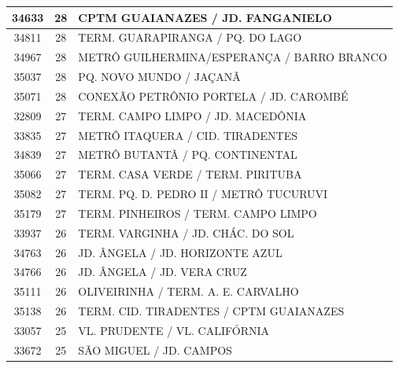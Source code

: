 \documentclass[
	12pt,				%
	oneside,			%
	a4paper,			%
	english,			%
	brazil				%
	]{abntex2ppgsi}
\begin{document}
{{\begin{apendicesenv}
\begin{longtable}{c|c|p{7cm}}
    34633 & 28    & CPTM GUAIANAZES / JD. FANGANIELO \\
\hline

    34811 & 28    & TERM. GUARAPIRANGA / PQ. DO LAGO \\
\hline

    34967 & 28    & METRÔ GUILHERMINA/ESPERANÇA / BARRO BRANCO \\
\hline

    35037 & 28    & PQ. NOVO MUNDO / JAÇANÃ \\
\hline

    35071 & 28    & CONEXÃO PETRÔNIO PORTELA / JD. CAROMBÉ \\
\hline

    32809 & 27    & TERM. CAMPO LIMPO / JD. MACEDÔNIA \\
\hline

    33835 & 27    & METRÔ ITAQUERA / CID. TIRADENTES \\
\hline

    34839 & 27    & METRÔ BUTANTÃ / PQ. CONTINENTAL \\
\hline

    35066 & 27    & TERM. CASA VERDE / TERM. PIRITUBA \\
\hline

    35082 & 27    & TERM. PQ. D. PEDRO II / METRÔ TUCURUVI \\
\hline

    35179 & 27    & TERM. PINHEIROS / TERM. CAMPO LIMPO \\
\hline

    33937 & 26    & TERM. VARGINHA / JD. CHÁC. DO SOL \\
\hline

    34763 & 26    & JD. ÂNGELA / JD. HORIZONTE AZUL \\
\hline

    34766 & 26    & JD. ÂNGELA / JD. VERA CRUZ \\
\hline

    35111 & 26    & OLIVEIRINHA / TERM. A. E. CARVALHO \\
\hline

    35138 & 26    & TERM. CID. TIRADENTES / CPTM GUAIANAZES \\
\hline

    33057 & 25    & VL. PRUDENTE / VL. CALIFÓRNIA \\
\hline

    33672 & 25    & SÃO MIGUEL / JD. CAMPOS \\
\hline


\end{longtable}
\end{apendicesenv}}}
\end{document}
